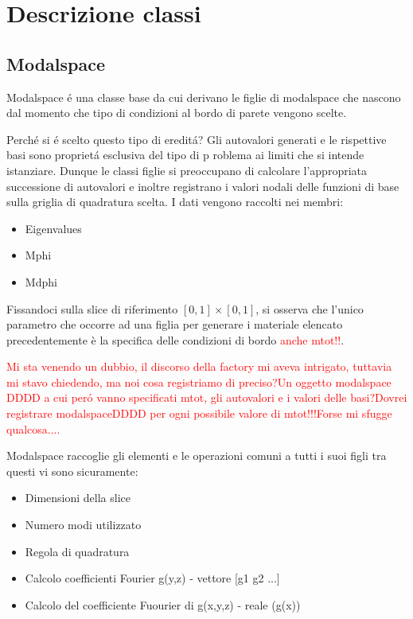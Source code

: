 \chapter{Descrizione classi}
\section{Modalspace}

Modalspace \'e una classe base da cui derivano le figlie di modalspace che nascono dal momento che tipo di condizioni al bordo di parete vengono scelte.

Perch\'e si \'e scelto questo tipo di eredit\'a? Gli autovalori generati e le rispettive basi sono propriet\'a esclusiva del tipo di p roblema ai limiti che si intende istanziare. Dunque le classi figlie si preoccupano di calcolare l'appropriata successione di autovalori e inoltre registrano i valori nodali delle funzioni di base sulla griglia di quadratura scelta. I dati vengono raccolti nei membri:

\begin{itemize}
\item Eigenvalues
\item Mphi
\item Mdphi
\end{itemize}

Fissandoci sulla slice di riferimento $[0,1]\times[0,1]$, si osserva che l'unico parametro che occorre ad una figlia per generare i materiale elencato precedentemente è la specifica delle condizioni di bordo \textcolor{red}{anche mtot!!}.

\textcolor{red}{Mi sta venendo un dubbio, il discorso della factory mi aveva intrigato, tuttavia mi stavo chiedendo, ma noi cosa registriamo di preciso?Un oggetto modalspace DDDD a cui per\'o vanno specificati mtot, gli autovalori e i valori delle basi?Dovrei registrare modalspaceDDDD per ogni possibile valore di mtot!!!Forse mi sfugge qualcosa....}


Modalspace raccoglie gli elementi e le operazioni comuni a tutti i suoi figli tra questi vi sono sicuramente:
\begin{itemize}
\item Dimensioni della slice
\item Numero modi utilizzato
\item Regola di quadratura
\item Calcolo coefficienti Fourier g(y,z) - vettore [g1 g2 ...]
\item Calcolo del coefficiente Fuourier di g(x,y,z) - reale (g(x))
\end{itemize}

